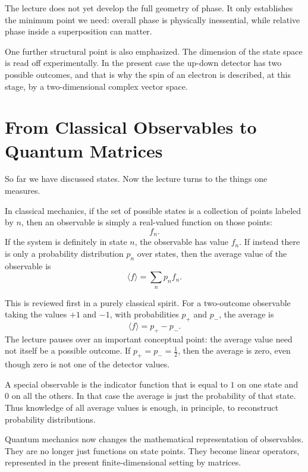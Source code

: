 The lecture does not yet develop the full geometry of phase. It only establishes the minimum point we need: overall phase is physically inessential, while relative phase inside a superposition can matter.

One further structural point is also emphasized. The dimension of the state space is read off experimentally. In the present case the up-down detector has two possible outcomes, and that is why the spin of an electron is described, at this stage, by a two-dimensional complex vector space.

\section{From Classical Observables to Quantum Matrices}

So far we have discussed states. Now the lecture turns to the things one measures.

In classical mechanics, if the set of possible states is a collection of points labeled by \(n\), then an observable is simply a real-valued function on those points:
\[
f_n.
\]
If the system is definitely in state \(n\), the observable has value \(f_n\). If instead there is only a probability distribution \(p_n\) over states, then the average value of the observable is
\begin{equation}
\langle f\rangle = \sum_n p_n f_n.
\end{equation}

This is reviewed first in a purely classical spirit. For a two-outcome observable taking the values \(+1\) and \(-1\), with probabilities \(p_+\) and \(p_-\), the average is
\begin{equation}
\langle f\rangle = p_+ - p_-.
\end{equation}
The lecture pauses over an important conceptual point: the average value need not itself be a possible outcome. If \(p_+=p_-=\frac{1}{2}\), then the average is zero, even though zero is not one of the detector values.

A special observable is the indicator function that is equal to \(1\) on one state and \(0\) on all the others. In that case the average is just the probability of that state. Thus knowledge of all average values is enough, in principle, to reconstruct probability distributions.

Quantum mechanics now changes the mathematical representation of observables. They are no longer just functions on state points. They become linear operators, represented in the present finite-dimensional setting by matrices.

